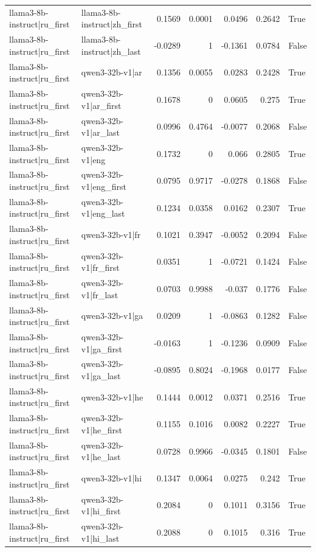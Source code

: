 \begin{table}
\begin{tabular}{l l r r r r l}
llama3-8b-instruct|ru_first & llama3-8b-instruct|zh_first & 0.1569 & 0.0001 & 0.0496 & 0.2642 & True \\
llama3-8b-instruct|ru_first & llama3-8b-instruct|zh_last & -0.0289 & 1 & -0.1361 & 0.0784 & False \\
llama3-8b-instruct|ru_first & qwen3-32b-v1|ar & 0.1356 & 0.0055 & 0.0283 & 0.2428 & True \\
llama3-8b-instruct|ru_first & qwen3-32b-v1|ar_first & 0.1678 & 0 & 0.0605 & 0.275 & True \\
llama3-8b-instruct|ru_first & qwen3-32b-v1|ar_last & 0.0996 & 0.4764 & -0.0077 & 0.2068 & False \\
llama3-8b-instruct|ru_first & qwen3-32b-v1|eng & 0.1732 & 0 & 0.066 & 0.2805 & True \\
llama3-8b-instruct|ru_first & qwen3-32b-v1|eng_first & 0.0795 & 0.9717 & -0.0278 & 0.1868 & False \\
llama3-8b-instruct|ru_first & qwen3-32b-v1|eng_last & 0.1234 & 0.0358 & 0.0162 & 0.2307 & True \\
llama3-8b-instruct|ru_first & qwen3-32b-v1|fr & 0.1021 & 0.3947 & -0.0052 & 0.2094 & False \\
llama3-8b-instruct|ru_first & qwen3-32b-v1|fr_first & 0.0351 & 1 & -0.0721 & 0.1424 & False \\
llama3-8b-instruct|ru_first & qwen3-32b-v1|fr_last & 0.0703 & 0.9988 & -0.037 & 0.1776 & False \\
llama3-8b-instruct|ru_first & qwen3-32b-v1|ga & 0.0209 & 1 & -0.0863 & 0.1282 & False \\
llama3-8b-instruct|ru_first & qwen3-32b-v1|ga_first & -0.0163 & 1 & -0.1236 & 0.0909 & False \\
llama3-8b-instruct|ru_first & qwen3-32b-v1|ga_last & -0.0895 & 0.8024 & -0.1968 & 0.0177 & False \\
llama3-8b-instruct|ru_first & qwen3-32b-v1|he & 0.1444 & 0.0012 & 0.0371 & 0.2516 & True \\
llama3-8b-instruct|ru_first & qwen3-32b-v1|he_first & 0.1155 & 0.1016 & 0.0082 & 0.2227 & True \\
llama3-8b-instruct|ru_first & qwen3-32b-v1|he_last & 0.0728 & 0.9966 & -0.0345 & 0.1801 & False \\
llama3-8b-instruct|ru_first & qwen3-32b-v1|hi & 0.1347 & 0.0064 & 0.0275 & 0.242 & True \\
llama3-8b-instruct|ru_first & qwen3-32b-v1|hi_first & 0.2084 & 0 & 0.1011 & 0.3156 & True \\
llama3-8b-instruct|ru_first & qwen3-32b-v1|hi_last & 0.2088 & 0 & 0.1015 & 0.316 & True \\

\end{tabular}
\end{table}
